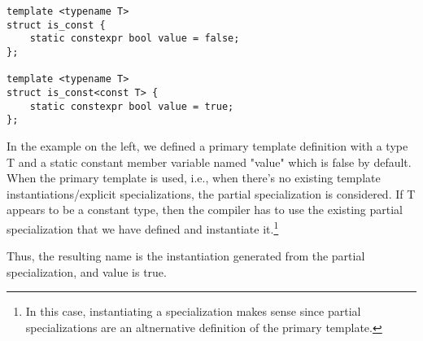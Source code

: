 \begin{paracol}{2}
\begin{verbatim}
template <typename T> 
struct is_const { 
    static constexpr bool value = false; 
}; 

template <typename T> 
struct is_const<const T> { 
    static constexpr bool value = true; 
};
\end{verbatim}

\switchcolumn

In the example on the left, we defined a primary template definition with a type T and a static constant member variable named "value" which is false by default. When the primary template is used, i.e., when there's no existing template instantiations/explicit specializations, the partial specialization is considered. If T appears to be a constant type, then the compiler has to use the existing partial specialization that we have defined and instantiate it.\footnote{In this case, instantiating a specialization makes sense since partial specializations are an altnernative definition of the primary template.}


Thus, the resulting name is the instantiation generated from the partial specialization, and value is true.
\end{paracol}

\newpage
